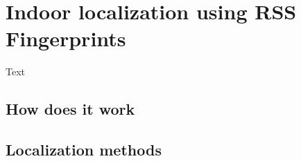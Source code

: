 \chapter{Indoor localization using RSS Fingerprints}\label{sec:Indoor localization using RSS Fingerptints}
Text

\section{How does it work}
\label{sec:HowDoesItWork}

\section{Localization methods}
\label{sec:LocalizationMethods}
